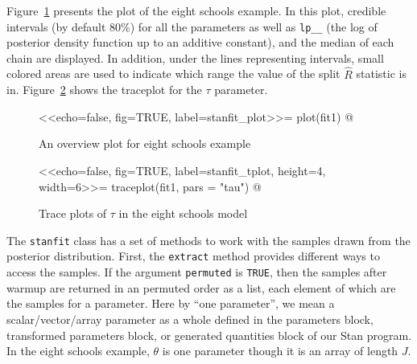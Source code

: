 \documentclass[12pt]{article}
\providecommand{\rstanfunidx}[1]{\index{\pkg{rstan} functions!#1}}
\newcommand{\code}[1]{{\tt #1}}
\newcommand{\strong}[1]{\texorpdfstring%
          {{\normalfont\fontseries{b}\selectfont #1}}%
            {#1}}
\let\pkg=\strong
\begin{document}
                Figure~\ref{fig0stanfitplot} presents the plot of the eight schools example. 
                In this plot, credible intervals (by default 80\%) for all the parameters
                as well as \code{lp\_\_} (the log of posterior density function up to an additive
                                          constant), and the median of each chain are displayed. In addition, under the lines
                representing intervals, small colored areas are used to indicate which range the 
                value of the split $\hat{R}$ statistic is in. Figure~\ref{fig0stanfittraceplot} shows the
                traceplot for the $\tau$ parameter.
                
                \begin{figure}[ht]
                \centering
                <<echo=false, fig=TRUE, label=stanfit_plot>>=
                  plot(fit1)
                @
                  \caption{An overview plot for eight schools example} 
                \label{fig0stanfitplot}
                \end{figure}
                
                \begin{figure}[ht]
                \centering
                <<echo=false, fig=TRUE, label=stanfit_tplot, height=4, width=6>>=
                  traceplot(fit1, pars = "tau")
                @
                  \caption{Trace plots of $\tau$ in the eight schools model} 
                \label{fig0stanfittraceplot}
                \end{figure}
                
                The \code{stanfit} class has a set of methods to work with the samples drawn 
                from the posterior distribution. First, the \code{extract}\rstanfunidx{extract} 
                method provides different ways to access the samples. If the argument \code{permuted} 
                is \code{TRUE}, then the samples after warmup are returned in an permuted order as a 
                list, each element of which are the samples for a parameter. Here by ``one parameter'', 
                we mean a scalar/vector/array parameter as a whole defined in the parameters block, 
                transformed parameters block, or generated quantities block of our Stan program. In the 
                eight schools example, $\theta$ is one parameter though it is an array of length $J$. 
                
\end{document}
